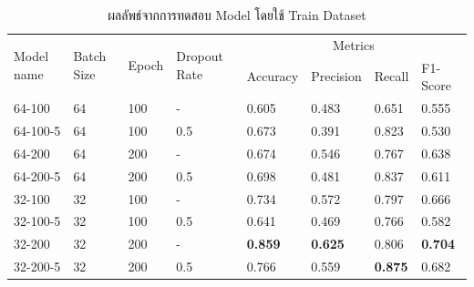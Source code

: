 \begin{table}[ht]
    \centering
    \caption{ผลลัพธ์จากการทดสอบ Model  โดยใช้ Train Dataset}
    \label{tab:model_train_performance}

    \begin{tabular}{|l|l|l|l|l|l|l|l|}
        \hline
        \multirow{2}{*}{Model name} & \multirow{2}{*}{Batch Size} & \multirow{2}{*}{Epoch} & \multirow{2}{*}{Dropout Rate} & \multicolumn{4}{c|}{Metrics}                                                    \\ \cline{5-8}
                                    &                             &                        &                               & Accuracy                     & Precision      & Recall         & F1-Score       \\ \hline
        64-100                      & 64                          & 100                    & -                             & 0.605                        & 0.483          & 0.651          & 0.555          \\ \hline
        64-100-5                    & 64                          & 100                    & 0.5                           & 0.673                        & 0.391          & 0.823          & 0.530          \\ \hline
        64-200                      & 64                          & 200                    & -                             & 0.674                        & 0.546          & 0.767          & 0.638          \\ \hline
        64-200-5                    & 64                          & 200                    & 0.5                           & 0.698                        & 0.481          & 0.837          & 0.611          \\ \hline
        32-100                      & 32                          & 100                    & -                             & 0.734                        & 0.572          & 0.797          & 0.666          \\ \hline
        32-100-5                    & 32                          & 100                    & 0.5                           & 0.641                        & 0.469          & 0.766          & 0.582          \\ \hline
        32-200                      & 32                          & 200                    & -                             & \textbf{0.859}               & \textbf{0.625} & 0.806          & \textbf{0.704} \\ \hline
        32-200-5                    & 32                          & 200                    & 0.5                           & 0.766                        & 0.559          & \textbf{0.875} & 0.682          \\ \hline
    \end{tabular}
\end{table}


